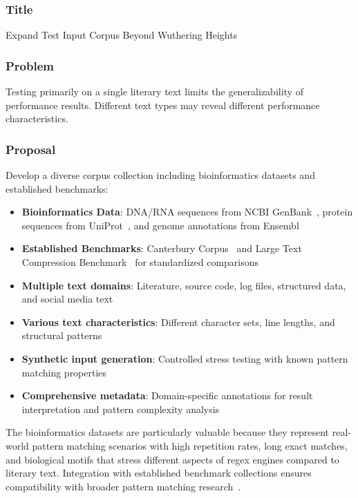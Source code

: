\documentclass[11pt,a4paper]{article}
\begin{document}
\subsubsection{Title}
Expand Test Input Corpus Beyond Wuthering Heights

\subsubsection{Problem}
Testing primarily on a single literary text limits the generalizability of performance results. Different text types may reveal different performance characteristics.

\subsubsection{Proposal}
Develop a diverse corpus collection including bioinformatics datasets and established benchmarks:
\begin{itemize}
    \item \textbf{Bioinformatics Data}: DNA/RNA sequences from NCBI GenBank~\cite{ncbi_genbank}, protein sequences from UniProt~\cite{uniprot2021}, and genome annotations from Ensembl~\cite{cunningham2022ensembl}
    \item \textbf{Established Benchmarks}: Canterbury Corpus~\cite{canterbury_corpus} and Large Text Compression Benchmark~\cite{large_text_benchmark} for standardized comparisons
    \item \textbf{Multiple text domains}: Literature, source code, log files, structured data, and social media text
    \item \textbf{Various text characteristics}: Different character sets, line lengths, and structural patterns
    \item \textbf{Synthetic input generation}: Controlled stress testing with known pattern matching properties
    \item \textbf{Comprehensive metadata}: Domain-specific annotations for result interpretation and pattern complexity analysis
\end{itemize}

The bioinformatics datasets are particularly valuable because they represent real-world pattern matching scenarios with high repetition rates, long exact matches, and biological motifs that stress different aspects of regex engines compared to literary text. Integration with established benchmark collections ensures compatibility with broader pattern matching research~\cite{altschul1990basic,gusfield1997algorithms}.
\end{document}
